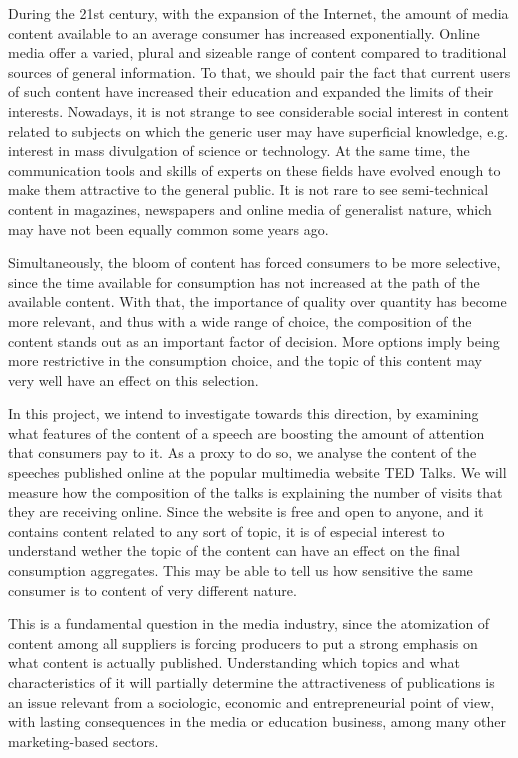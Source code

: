 \documentclass[a4paper, 11pt]{article} %
\begin{document}
During the 21st century, with the expansion of the Internet, the amount of media content available to an average consumer has increased exponentially. Online media offer a varied, plural and sizeable range of content compared to traditional sources of general information. To that, we should pair the fact that current users of such content have increased their education and expanded the limits of their interests. Nowadays, it is not strange to see considerable social interest in content related to subjects on which the generic user may have superficial knowledge, e.g. interest in mass divulgation of science or technology. At the same time, the communication tools and skills of experts on these fields have evolved enough to make them attractive to the general public. It is not rare to see semi-technical content in magazines, newspapers and online media of generalist nature, which may have not been equally common some years ago.

Simultaneously, the bloom of content has forced consumers to be more selective, since the time available for consumption has not increased at the path of the available content. With that, the importance of quality over quantity has become more relevant, and thus with a wide range of choice, the composition of the content stands out as an important factor of decision. More options imply being more restrictive in the consumption choice, and the topic of this content may very well have an effect on this selection.

In this project, we intend to investigate towards this direction, by examining what features of the content of a speech are boosting the amount of attention that consumers pay to it. As a proxy to do so, we analyse the content of the speeches published online at the popular multimedia website TED Talks. We will measure how the composition of the talks is explaining the number of visits that they are receiving online. Since the website is free and open to anyone, and it contains content related to any sort of topic, it is of especial interest to understand wether the topic of the content can have an effect on the final consumption aggregates. This may be able to tell us how sensitive the same consumer is to content of very different nature.

This is a fundamental question in the media industry, since the atomization of content among all suppliers is forcing producers to put a strong emphasis on what content is actually published. Understanding which topics and what characteristics of it will partially determine the attractiveness of publications is an issue relevant from a sociologic, economic and entrepreneurial point of view, with lasting consequences in the media or education business, among many other marketing-based sectors.
\end{document}
